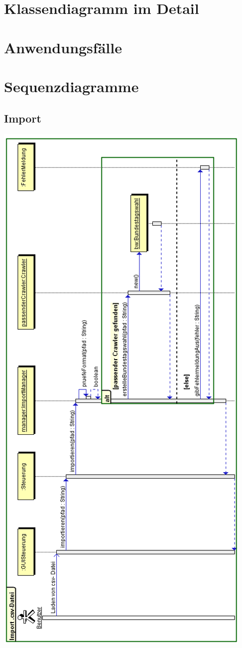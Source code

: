 \documentclass[12pt,a4paper,titlepage]{article}
\begin{document}
\section{Klassendiagramm im Detail}

\section{Anwendungsfälle}



\section{Sequenzdiagramme}
\subsection{Import}
\includegraphics[scale=0.7]{Import-Sequenzdiagramm.png} 
\end{document}
